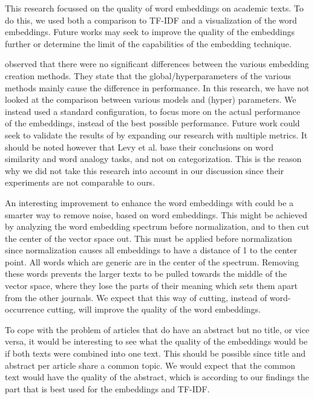 \documentclass[../../Thesis.tex]{subfiles}
\begin{document}
This research focussed on the quality of word embeddings on academic texts. To do this, we used both a comparison to TF-IDF and a visualization of the word embeddings. Future works may seek to improve the quality of the embeddings further or determine the limit of the capabilities of the embedding technique. 

\citet{levy2015improving} observed that there were no significant differences between the various embedding creation methods. They state that the global/hyperparameters of the various methods mainly cause the difference in performance. In this research, we have not looked at the comparison between various models and (hyper) parameters. We instead used a standard configuration, to focus more on the actual performance of the embeddings, instead of the best possible performance. Future work could seek to validate the results of \citet{levy2015improving} by expanding our research with multiple metrics. It should be noted however that Levy et al. base their conclusions on word similarity and word analogy tasks, and not on categorization. This is the reason why we did not take this research into account in our discussion since their experiments are not comparable to ours.

An interesting improvement to enhance the word embeddings with could be a smarter way to remove noise, based on word embeddings. This might be achieved by analyzing the word embedding spectrum before normalization, and to then cut the center of the vector space out. This must be applied before normalization since normalization causes all embeddings to have a distance of 1 to the center point. All words which are generic are in the center of the spectrum. Removing these words prevents the larger texts to be pulled towards the middle of the vector space, where they lose the parts of their meaning which sets them apart from the other journals. We expect that this way of cutting, instead of word-occurrence cutting, will improve the quality of the word embeddings.

To cope with the problem of articles that do have an abstract but no title, or vice versa, it would be interesting to see what the quality of the embeddings would be if both texts were combined into one text. This should be possible since title and abstract per article share a common topic. We would expect that the common text would have the quality of the abstract, which is according to our findings the part that is best used for the embeddings and TF-IDF.
\end{document}
